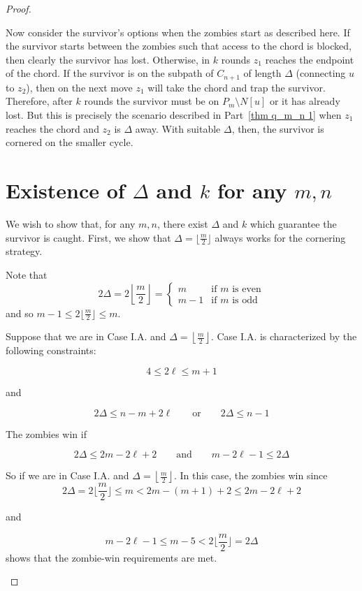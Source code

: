 \begin{proof}
\begin{proofpart}
  Now consider the survivor's options when the zombies start as described here.
  If the survivor starts between the zombies such that
  access to the chord is blocked, then clearly the survivor has lost. Otherwise,
   in $k$ rounds $z_1$ reaches the endpoint of the chord. If the survivor is on the subpath of $C_{n+1}$ of length $\Delta$ (connecting $u$ to $z_2$), then on the next move $z_1$ will take the chord and trap the survivor.
   Therefore, after $k$ rounds the survivor must be on $P_m \setminus N[u]$ or it has already lost. But this is precisely the scenario described in Part~\ref{thm q_m_n 1} when $z_1$ reaches the chord and $z_2$ is $\Delta$ away. With suitable $\Delta$, then, the survivor is cornered on the smaller cycle.
\end{proofpart}

\section{Existence of $\Delta$ and $k$ for any $m,n$ \label{thm q_m_n 3}}

\begin{proofpart}
We wish to show that, for any $m, n$, there exist $\Delta$ and $k$
which guarantee the survivor is caught.
First, we show that $\Delta = \lfloor \frac{m}{2} \rfloor$ always
works for the cornering strategy.

Note that
\[
2\Delta = 2 \left\lfloor \frac{m}{2} \right\rfloor =
\begin{cases}
m & \text{if $m$ is even} \\
m -1 & \text{if $m$ is odd}
\end{cases}
\]
and so $m -1 \leq 2 \lfloor \frac{m}{2} \rfloor \leq m$.

Suppose that we are in Case I.A. and $\Delta = \left\lfloor \frac{m}{2} \right\rfloor$.
Case I.A. is characterized by the following constraints:

\[ 4 \leq 2 \ell \leq m+1 \]
\begin{center}and\end{center}
\[ 2\Delta \leq n - m + 2\ell \qquad \text{or} \qquad 2\Delta \leq n-1 \]

The zombies win if

\[ 2 \Delta \leq 2 m- 2 \ell + 2 \qquad \text{and} \qquad m - 2\ell  -1 \leq 2 \Delta \]

So if we are in Case I.A. and $\Delta = \left\lfloor \frac{m}{2} \right\rfloor$. In this case, the zombies win since
\[ 2 \Delta = 2 \lfloor \frac{m}{2} \rfloor \leq m < 2m - (m+1) + 2\leq 2 m- 2 \ell + 2 \]
\begin{center}and\end{center}
\[ m - 2\ell -1 \leq m - 5 < 2 \lfloor \frac{m}{2} \rfloor = 2 \Delta \]
shows that the zombie-win requirements are met.


\end{proofpart}
\end{proof}
